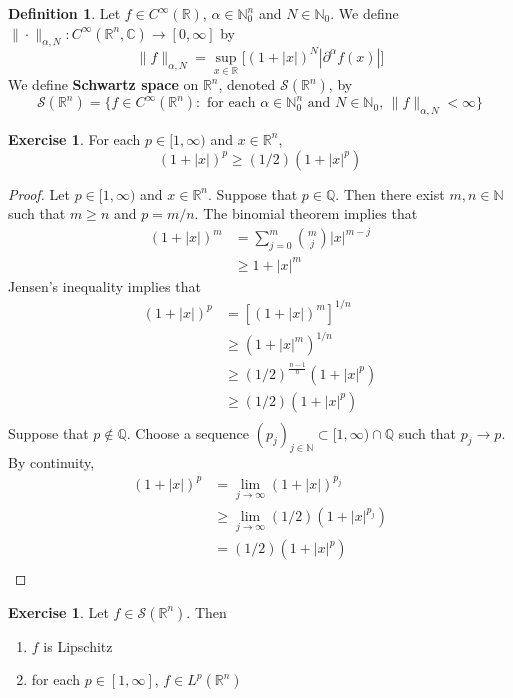 \documentclass[12pt]{amsart}
\theoremstyle{definition}
\newtheorem{defn}[definition]{Definition}
\newtheorem{ex}[definition]{Exercise}
\newcommand{\p}{\partial}
\newcommand{\al}{\alpha}
\newcommand{\C}{\mathbb{C}}
\newcommand{\N}{\mathbb{N}}
\newcommand{\R}{\mathbb{R}}
\newcommand{\Q}{\mathbb{Q}}
\newcommand{\MS}{\mathcal{S}}
\newcommand{\RG}{[0,\infty]}
\newcommand{\lex}[1]{\label{ex:#1}}
\newcommand{\ld}[1]{\label{defn:#1}}
\begin{document}
	\begin{defn}
		\ld{101} Let $f \in C^{\infty}(\R)$, $\al \in \N_0^n$ and $N \in \N_0$. We define $\| \cdot \|_{\al, N}: C^{\infty}(\R^n, \C) \rightarrow \RG$ by 
		$$\|f\|_{\al, N} = \sup_{x \in \R} \bigg[  (1 + |x|)^N |\p^{\al}f (x)| \bigg] $$
		We define \textbf{Schwartz space} on $\R^n$, denoted $\MS(\R^n)$, by $$\MS(\R^n) = \{f \in C^{\infty}(\R^n): \text{ for each $\al \in \N_0^n$ and $N \in  \N_0$, } \|f\|_{\al, N} < \infty\}$$
	\end{defn}

	\begin{ex}
		For each $p \in [1, \infty)$ and $x \in \R^n$, 
		$$(1 + |x|)^p \geq (1/2) (1 + |x|^p)$$
	\end{ex}
	
	\begin{proof}
		Let $p \in [1, \infty)$ and $x \in \R^n$. Suppose that $p \in \Q$. Then there exist $m,n \in \N$ such that $m \geq n$ and $p = m/n$. The binomial theorem implies that 
		\begin{align*}
			(1 + |x|)^m
			& = \sum_{j=0}^{m} {m \choose j}|x|^{m-j} \\
			& \geq 1 + |x|^m
		\end{align*} 
		Jensen's inequality implies that 
		\begin{align*}
			(1 + |x|)^p
			& = [(1 + |x|)^m]^{1/n} \\
			& \geq (1 + |x|^m)^{1/n} \\
			& \geq (1/2)^{\frac{n-1}{n}} (1 + |x|^p) \\
			& \geq (1/2) (1 + |x|^p) \\
		\end{align*}
		Suppose that $p \not \in \Q$. Choose a sequence $(p_j)_{j \in \N} \subset [1, \infty) \cap \Q$ such that $p_j \rightarrow p$. By continuity, 
		\begin{align*}
			(1 + |x|)^p
			& = \lim_{j \rightarrow \infty} (1 + |x|)^{p_j} \\
			& \geq \lim_{j \rightarrow \infty} (1/2) (1 + |x|^{p_j}) \\
			& = (1/2) (1 + |x|^p) \\
		\end{align*}
	\end{proof}

	\begin{ex}
		\lex{102} Let $f \in \MS(\R^n)$. Then 
		\begin{enumerate}
			\item $f$ is Lipschitz 
			\item for each $p \in [1, \infty]$, $f \in  L^p(\R^n)$
		\end{enumerate}
	\end{ex}
	
\end{document}
